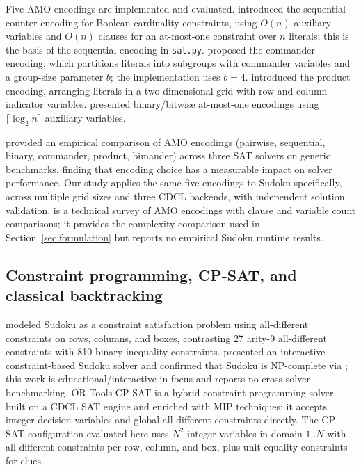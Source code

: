 \documentclass[a4paper,fleqn]{cas-sc}
\begin{document}
Five AMO encodings are implemented and evaluated. \citet{sinz2005towards} introduced the sequential counter encoding for Boolean cardinality constraints, using \(O(n)\) auxiliary variables and \(O(n)\) clauses for an at-most-one constraint over \(n\) literals; this is the basis of the sequential encoding in \texttt{sat.py}. \citet{klieber2007effective} proposed the commander encoding, which partitions literals into subgroups with commander variables and a group-size parameter \(b\); the implementation uses \(b=4\). \citet{chen2010new} introduced the product encoding, arranging literals in a two-dimensional grid with row and column indicator variables. \citet{frisch2010sat} presented binary/bitwise at-most-one encodings using \(\lceil\log_2 n\rceil\) auxiliary variables.

\citet{nguyen2020empirical} provided an empirical comparison of AMO encodings (pairwise, sequential, binary, commander, product, bimander) across three SAT solvers on generic benchmarks, finding that encoding choice has a measurable impact on solver performance. Our study applies the same five encodings to Sudoku specifically, across multiple grid sizes and three CDCL backends, with independent solution validation. \citet{hn2013efficient} is a technical survey of AMO encodings with clause and variable count comparisons; it provides the complexity comparison used in Section~\ref{sec:formulation} but reports no empirical Sudoku runtime results.

\subsection{Constraint programming, CP-SAT, and classical backtracking}

\citet{simonis2005sudoku} modeled Sudoku as a constraint satisfaction problem using all-different constraints on rows, columns, and boxes, contrasting 27 arity-9 all-different constraints with 810 binary inequality constraints. \citet{aaai2007interactive} presented an interactive constraint-based Sudoku solver and confirmed that Sudoku is NP-complete via \citet{yato2003sudoku}; this work is educational/interactive in focus and reports no cross-solver benchmarking. OR-Tools CP-SAT \citep{ortools2026} is a hybrid constraint-programming solver built on a CDCL SAT engine and enriched with MIP techniques; it accepts integer decision variables and global all-different constraints directly. The CP-SAT configuration evaluated here uses \(N^2\) integer variables in domain \(1..N\) with all-different constraints per row, column, and box, plus unit equality constraints for clues.
\end{document}
